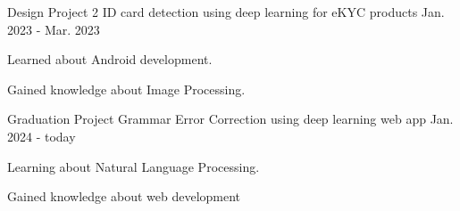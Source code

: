 \begin{cventries}
  \cventry
  {Design Project 2}
  {ID card detection using deep learning for eKYC products}
  {}
  {Jan. 2023 - Mar. 2023}
  {
    \begin{cvitems}
      \item {Learned about Android development.}
      \item {Gained knowledge about Image Processing.}
    \end{cvitems}
  }

\end{cventries}

\begin{cventries}
  \cventry
  {Graduation Project}
  {Grammar Error Correction using deep learning web app}
  {}
  {Jan. 2024 - today}
  {
    \begin{cvitems}
      \item {Learning about Natural Language Processing.}
      \item {Gained knowledge about web development}
    \end{cvitems}
  }

\end{cventries}
